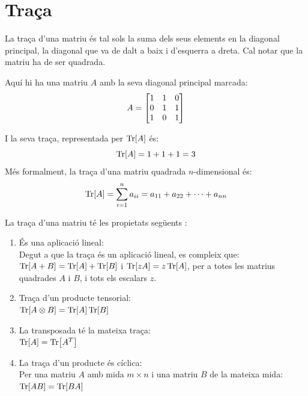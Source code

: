 

\section{Traça}
La traça d'una matriu és tal sols la suma dels seus elements en la diagonal principal, la diagonal que va de dalt a baix i d'esquerra a dreta. Cal notar que la matriu ha de ser quadrada. 

Aquí hi ha una matriu $A$ amb la seva diagonal principal marcada:
$$A = 
	\begin{bmatrix}
		\tikzmarktrace{top}{1} & \tikzmarktrace{top2}{1} & 0 \\
		0 & 1 & \tikzmarktrace{bottom2}{1} \\
		\tikzmarktrace{end}{1} & 0 & \tikzmarktrace{bottom}{1}\\
	\end{bmatrix}
$$

I la seva traça, representada per $\Tr[A]$ és:
$$
\Tr[A] = 1 + 1 + 1 = 3
$$
Més formalment, la traça d'una matriu quadrada $n$-dimensional és:
$$
\Tr[A] = \sum_{i=1}^{n} a_{ii} = a_{11} + a_{22} + \cdots + a_{nn}
$$

La traça d'una matriu té les propietats següents  \cite{QCandQI:trace}:
\begin{enumerate}
	\item És una aplicació lineal: \\
	Degut a que la traça és un aplicació lineal, es compleix que:\\
	$\Tr[A+B] = \Tr[A] + \Tr[B]$ i $\Tr[zA] = z \Tr[A]$, per a totes les matrius quadrades $A$ i $B$, i tots els escalars $z$.
	\item Traça d'un producte tensorial: \\
	$\Tr[A \otimes B] = \Tr[A]\Tr[B]$
	\item La transposada té la mateixa traça: \\
	$\Tr[A]=\Tr[A^T]$
	\item La traça d'un producte és cíclica: \\
	Per una matriu $A$ amb mida $m \times n$ i una matriu $B$ de la mateixa mida:\\
	$\Tr[AB]=\Tr[BA]$
\end{enumerate}

